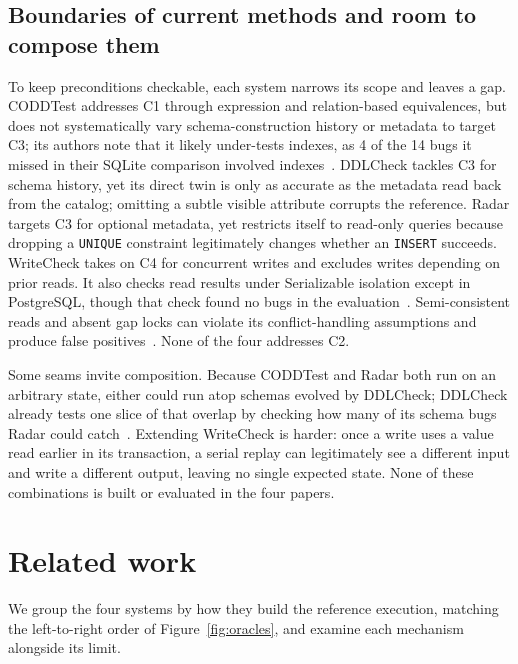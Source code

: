 \subsection{Boundaries of current methods and room to compose them}
To keep preconditions checkable, each system narrows its scope and leaves a gap. CODDTest addresses C1 through expression and relation-based equivalences, but does not systematically vary schema-construction history or metadata to target C3; its authors note that it likely under-tests indexes, as 4 of the 14 bugs it missed in their SQLite comparison involved indexes~\cite[Sec.~4.2]{coddtest}. DDLCheck tackles C3 for schema history, yet its direct twin is only as accurate as the metadata read back from the catalog; omitting a subtle visible attribute corrupts the reference. Radar targets C3 for optional metadata, yet restricts itself to read-only queries because dropping a \texttt{UNIQUE} constraint legitimately changes whether an \texttt{INSERT} succeeds. WriteCheck takes on C4 for concurrent writes and excludes writes depending on prior reads. It also checks read results under Serializable isolation except in PostgreSQL, though that check found no bugs in the evaluation~\cite[Secs.~5.4, 6.2]{writecheck}. Semi-consistent reads and absent gap locks can violate its conflict-handling assumptions and produce false positives~\cite[Sec.~6.4]{writecheck}. None of the four addresses C2.

Some seams invite composition. Because CODDTest and Radar both run on an arbitrary state, either could run atop schemas evolved by DDLCheck; DDLCheck already tests one slice of that overlap by checking how many of its schema bugs Radar could catch~\cite[Table~4]{ddlcheck}. Extending WriteCheck is harder: once a write uses a value read earlier in its transaction, a serial replay can legitimately see a different input and write a different output, leaving no single expected state. None of these combinations is built or evaluated in the four papers.

\section{Related work}\label{sec:related}
We group the four systems by how they build the reference execution, matching the left-to-right order of Figure~\ref{fig:oracles}, and examine each mechanism alongside its limit.

